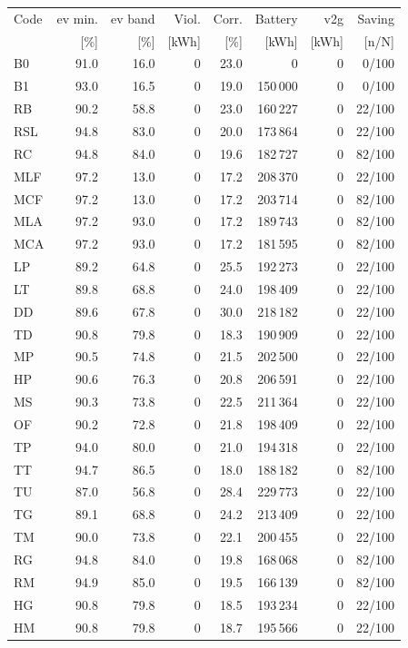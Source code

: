 \noindent\begin{minipage}{\textwidth}\singlespacing\captionsetup{font=footnotesize}
\setlength{\tabcolsep}{4pt}
\renewcommand{\arraystretch}{1.0}
\label{tab:full-scorecard-6-1}
\fontsize{8}{9}\selectfont
\begin{tabular*}{\textwidth}{@{\extracolsep{\fill}}lrrrrrrr@{}}
\toprule
Code & \gls{ev} min. & \gls{ev} band & Viol. & Corr. & Battery & \gls{v2g} & Saving\\
 & [\%] & [\%] & [kWh] & [\%] & [kWh] & [kWh] & [n/N]\\
\midrule
B0 & 91.0 & 16.0 & 0 & 23.0 & 0 & 0 & 0/100\\
B1 & 93.0 & 16.5 & 0 & 19.0 & 150\,000 & 0 & 0/100\\
RB & 90.2 & 58.8 & 0 & 23.0 & 160\,227 & 0 & 22/100\\
RSL & 94.8 & 83.0 & 0 & 20.0 & 173\,864 & 0 & 22/100\\
RC & 94.8 & 84.0 & 0 & 19.6 & 182\,727 & 0 & 82/100\\
MLF & 97.2 & 13.0 & 0 & 17.2 & 208\,370 & 0 & 22/100\\
MCF & 97.2 & 13.0 & 0 & 17.2 & 203\,714 & 0 & 82/100\\
MLA & 97.2 & 93.0 & 0 & 17.2 & 189\,743 & 0 & 82/100\\
MCA & 97.2 & 93.0 & 0 & 17.2 & 181\,595 & 0 & 82/100\\
LP & 89.2 & 64.8 & 0 & 25.5 & 192\,273 & 0 & 22/100\\
LT & 89.8 & 68.8 & 0 & 24.0 & 198\,409 & 0 & 22/100\\
DD & 89.6 & 67.8 & 0 & 30.0 & 218\,182 & 0 & 22/100\\
TD & 90.8 & 79.8 & 0 & 18.3 & 190\,909 & 0 & 22/100\\
MP & 90.5 & 74.8 & 0 & 21.5 & 202\,500 & 0 & 22/100\\
HP & 90.6 & 76.3 & 0 & 20.8 & 206\,591 & 0 & 22/100\\
MS & 90.3 & 73.8 & 0 & 22.5 & 211\,364 & 0 & 22/100\\
OF & 90.2 & 72.8 & 0 & 21.8 & 198\,409 & 0 & 22/100\\
TP & 94.0 & 80.0 & 0 & 21.0 & 194\,318 & 0 & 22/100\\
TT & 94.7 & 86.5 & 0 & 18.0 & 188\,182 & 0 & 82/100\\
TU & 87.0 & 56.8 & 0 & 28.4 & 229\,773 & 0 & 22/100\\
TG & 89.1 & 68.8 & 0 & 24.2 & 213\,409 & 0 & 22/100\\
TM & 90.0 & 73.8 & 0 & 22.1 & 200\,455 & 0 & 22/100\\
RG & 94.8 & 84.0 & 0 & 19.8 & 168\,068 & 0 & 82/100\\
RM & 94.9 & 85.0 & 0 & 19.5 & 166\,139 & 0 & 82/100\\
HG & 90.8 & 79.8 & 0 & 18.5 & 193\,234 & 0 & 22/100\\
HM & 90.8 & 79.8 & 0 & 18.7 & 195\,566 & 0 & 22/100\\
\bottomrule\end{tabular*}
\end{minipage}\par\medskip
